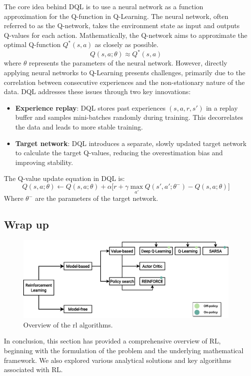  The core idea behind DQL is to use a neural network as a function approximation for the Q-function in Q-Learning. 
  The neural network, often referred to as the Q-network, 
  takes the environment state as input and outputs Q-values for each action.
%  
Mathematically, the Q-network aims to approximate the optimal Q-function \(Q^*(s, a)\) 
 as closely as possible.
\begin{equation}
Q(s, a; \theta) \approx Q^*(s, a)
\end{equation}
where \(\theta\) represents the parameters of the neural network.
%
However, directly applying neural networks to Q-Learning presents challenges, 
 primarily due to the correlation between consecutive experiences and the non-stationary nature of the data. 
 DQL addresses these issues through two key innovations:
\begin{itemize}
  \item \textbf{Experience replay}: DQL stores past experiences \((s, a, r, s')\) in a replay buffer and samples mini-batches randomly during training. 
  This decorrelates the data and leads to more stable training.
  \item \textbf{Target network}: DQL introduces a separate, 
  slowly updated target network to calculate the target Q-values, 
  reducing the overestimation bias and improving stability.
\end{itemize}
The Q-value update equation in DQL is:
\begin{equation}
Q(s, a; \theta) \leftarrow Q(s, a; \theta) + \alpha \Big[ r + \gamma \max_{a'} Q(s', a'; \theta^-) - Q(s, a; \theta) \Big]
\end{equation}
Where \(\theta^-\) are the parameters of the target network.
\subsection{Wrap up}
\begin{figure}
  \includegraphics[width=\textwidth]{chapters/img/rl-overview.drawio.pdf}
  \caption{Overview of the \ac{rl} algorithms.}\label{fig:rl:overview}
\end{figure}
In conclusion, 
 this section has provided a comprehensive overview of RL, 
 beginning with the formulation of the problem and the underlying mathematical framework. 
 We also explored various analytical solutions and key algorithms associated with RL. 

